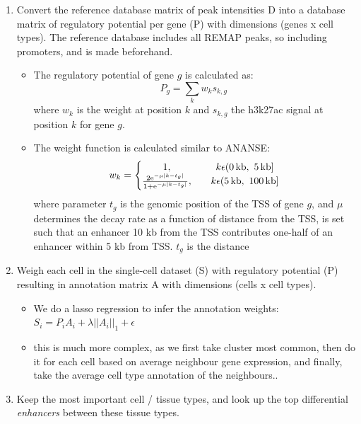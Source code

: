 \begin{enumerate}
    \item Convert the reference database matrix of peak intensities D into a database matrix of regulatory potential per gene (P) with dimensions (genes x cell types). The reference database includes all REMAP peaks, so including promoters, and is made beforehand. 
    \begin{itemize}
        \item The regulatory potential of gene $g$ is calculated as: \begin{equation*}{P_{g}} = \sum\limits_k {{w_{k}}{s_{k,g}}\ } \end{equation*}
where $w_k$ is the weight at position $k$ and $s_{k,g}$ the h3k27ac signal at position $k$ for gene $g$.
        \item The weight function is calculated similar to ANANSE: \begin{equation*} w_k=\left\{\begin{matrix} 1, && k\epsilon (0\,{\rm kb},\ 5\,{\rm kb}]\\ \frac{2{\rm e}^{-\mu|k-t_g|} }{1+{\rm e}^{-\mu|k-t_g|}}, && k\epsilon (5\,{\rm kb},\ 100\,{\rm kb}] \end{matrix}\right. \end{equation*}
where parameter $t_g$ is the genomic position of the TSS of gene $g$, and $\mu$ determines the decay rate as a function of distance from the TSS, is set such that an enhancer 10 kb from the TSS contributes one-half of an enhancer within 5 kb from TSS. $t_g$ is the distance
    \end{itemize}

    \item Weigh each cell in the single-cell dataset (S) with regulatory potential (P) resulting in annotation matrix A with dimensions (cells x cell types).
    \begin{itemize}
        \item We do a lasso regression to infer the annotation weights: $S_i = P_i A_i + \lambda ||A_i||_1 +\epsilon$
        \item this is much more complex, as we first take cluster most common, then do it for each cell based on average neighbour gene expression, and finally, take the average cell type annotation of the neighbours..
    \end{itemize}

    \item Keep the most important cell / tissue types, and look up the top differential \textit{enhancers} between these tissue types.


\end{enumerate}
